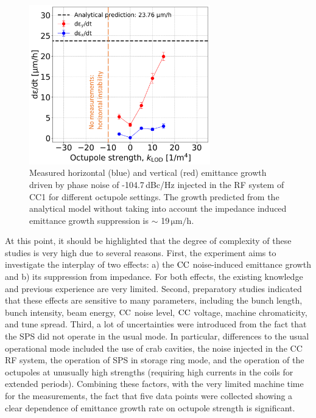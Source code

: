 \begin{figure}[!h]
   \centering         
   \includegraphics[width=0.7\textwidth]{images/Ch8/emit_H_and_V_octupole_scan_background_growth_subtracted_modified.png}
       \caption{Measured horizontal (blue) and vertical (red) emittance growth driven by phase noise of -104.7\,dBc/Hz injected in the RF system of CC1 for different octupole settings. The growth predicted from the analytical model without taking into account the impedance induced emittance growth suppression is $\sim$ 19\,$\mathrm{\mu m/h}$.}
       \label{fig:H_V_emit_growth_background_subtracted_octupole_scan}
\end{figure}

At this point, it should be highlighted that the degree of complexity of these studies is very high due to several reasons. First, the experiment aims to investigate the interplay of two effects: a) the ${\mathrm{CC}}$ noise-induced emittance growth and b) its suppression from impedance.  For both effects, the existing knowledge and previous experience are very limited. %
Second, preparatory studies indicated that these effects are sensitive to many parameters, including the bunch length, bunch intensity, beam energy, ${\mathrm{CC}}$ noise level, ${\mathrm{CC}}$ voltage, machine chromaticity, and tune spread. Third, a lot of uncertainties were introduced from the fact that the SPS did not operate in the usual mode. In particular, differences to the usual operational mode included the use of crab cavities, the noise injected in the CC RF system, the operation of SPS in storage ring mode, and the operation of the octupoles at unusually high strengths (requiring high currents in the coils for extended periods). %
Combining these factors, with the very limited machine time for the measurements, the fact that five data points were collected showing a clear dependence of emittance growth rate on octupole strength is significant.

